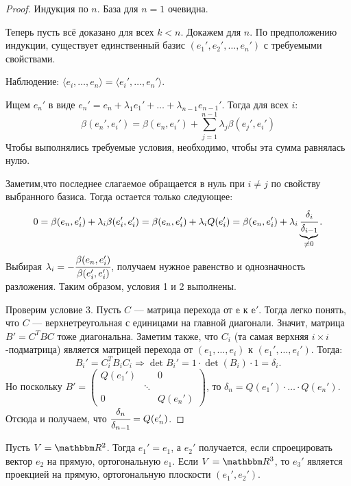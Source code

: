 \begin{proof}
	Индукция по $n$. База для $n = 1$ очевидна. 
	\par Теперь пусть всё доказано для всех $k<n$. Докажем для $n$. По предположению индукции, существует единственный базис $(e_1', e_2', \ldots, e_n')$ с требуемыми свойствами.
	
	Наблюдение: $\langle e_i, \ldots, e_n\rangle = \langle e_i', \ldots, e_n'\rangle$.
	
	Ищем $e_n'$ в виде $e_n' = e_n + \lambda_1 e_1' + \ldots + \lambda_{n-1}e_{n-1}'$. Тогда для всех $i$:
	\[
 \beta(e_n', e_i') = \beta(e_n, e_i') + \sum\limits^{n-1}_{j = 1} \lambda_j\beta (e_j', e_i')
	\]
	Чтобы выполнялись требуемые условия, необходимо, чтобы эта сумма равнялась нулю.
	
	Заметим,что последнее слагаемое обращается в нуль при $i \neq j$ по свойству выбранного базиса. Тогда остается только следующее:
	\[
		0 = \beta(e_n, e_i') + \lambda_i \beta(e_i', e_i')= \beta(e_n, e_i') +\lambda_i Q(e_i') = \beta(e_n, e_i') + \lambda_i\underbrace{\cfrac{\delta_i}{\delta_{i - 1}}}_{\neq 0}.
	\]
	Выбирая $\lambda_i = -\cfrac{\beta(e_n, e_i')}{\beta(e_i', e_i')}$, получаем нужное равенство и  однозначность разложения. Таким образом, условия 1 и 2 выполнены.
	
	Проверим условие 3. Пусть $C$ --- матрица перехода от $\mathbb{e}$ к $\mathbb{e}'$. Тогда легко понять, что $C$ --- верхнетреугольная с единицами на главной диагонали. Значит, матрица $B' = C^{T}BC$ тоже диагональна. Заметим также, что $C_i$ (та самая верхняя $i\times i$-подматрица) является матрицей перехода от $(e_1, \ldots, e_i)$ к $(e_1', \ldots, e_i')$. Тогда:
	\[
		B_i' = C_i^TB_iC_i \Rightarrow \det B_i' = 1\cdot \det(B_i) \cdot 1 = \delta_i.
	\]
	Но поскольку $B' = \begin{pmatrix}
		Q(e_1')& & 0 \\
		 & \ddots&  \\
		 0 && Q(e_n')
	\end{pmatrix}$, то $\delta_n = Q(e_1')\cdot\ldots\cdot Q(e_n')$. Отсюда и получаем, что $\cfrac{\delta_n}{\delta_{n-1}} = Q(e_n')$.
\end{proof}

\begin{Examples}
Пусть $V = \R^2$. Тогда $e_1' = e_1$, а $e_2'$ получается, если спроецировать вектор $e_2$ на прямую, ортогональную $e_1$. Если $V = \R^3$, то $e_3'$ является проекцией на прямую, ортогональную плоскости $(e_1', e_2')$.
\end{Examples}

